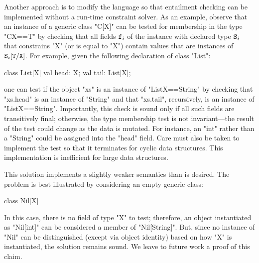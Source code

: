 Another approach is to modify the language
so that entailment
checking can be implemented without a run-time constraint solver.
As an example, observe that an instance of a generic class \xcd"C[X]"
can be tested for membership in the type \xcd"C{X==T}" by
checking that all fields ${\tt f}_i$ of the instance with
declared type ${\tt S}_i$ that constrains \xcd"X" (or is equal
to \xcd"X") contain values
that are instances of ${\tt S}_i[{\tt T}/{\tt X}]$.
For example, given the following declaration of class \xcd"List":
{
\begin{xten}
class List[X] {
  val head: X;
  val tail: List[X];
}
\end{xten}
}
\noindent
one can test if the object \xcd"xs" is an instance of \xcd"List{X==String}"
by checking that \xcd"xs.head" is an instance of \xcd"String"
and that \xcd"xs.tail", recursively, is an instance of \xcd"List{X==String}".
Importantly, this check is sound only if all such fields are
transitively final;
otherwise, the type membership test is not invariant---the
result of the test could change as the data is mutated.
For
instance, an \xcd"int" rather than a \xcd"String" could be assigned 
into the \xcd"head" field.  Care must also be taken to implement the
test so that it terminates for cyclic data structures.
This implementation is inefficient for large data structures.

This solution implements a slightly weaker semantics
than is desired.
The problem is best illustrated by considering an empty generic
class:
{
\begin{xten}
class Nil[X] { }
\end{xten}
}
\noindent
In this case, there is no field of type \xcd"X" to test;
therefore, an object instantiated as \xcd"Nil[int]" 
can be considered a member of \xcd"Nil[String]". 
But, since no instance of \xcd"Nil" can be distinguished (except
via object identity) based on how \xcd"X" is instantiated,
the solution remains sound.
We leave to future work a proof of this claim.


